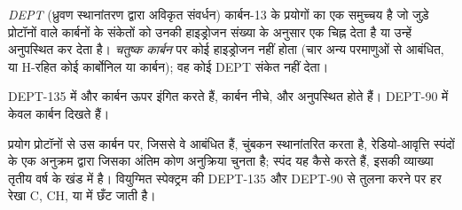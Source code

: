 \begin{definition}[DEPT]\label{def:b2:structure-determination:dept}
\emph{DEPT} (ध्रुवण स्थानांतरण द्वारा अविकृत संवर्धन) कार्बन-13 के प्रयोगों का एक समुच्चय है
जो जुड़े प्रोटॉनों वाले कार्बनों के संकेतों को उनकी हाइड्रोजन संख्या के अनुसार एक चिह्न देता है या उन्हें
अनुपस्थित कर देता है। \emph{चतुष्क कार्बन} पर कोई हाइड्रोजन नहीं होता
(चार अन्य परमाणुओं से आबंधित, या H-रहित कोई कार्बोनिल या  कार्बन); वह कोई DEPT संकेत नहीं देता।
\end{definition}

\begin{proposition}[DEPT पढ़ना]\label{prop:b2:structure-determination:dept}
DEPT-135 में  और  कार्बन ऊपर इंगित करते हैं,  कार्बन नीचे, और 
अनुपस्थित होते हैं। DEPT-90 में केवल  कार्बन दिखते हैं।
\end{proposition}

\admitted

प्रयोग प्रोटॉनों से उस कार्बन पर, जिससे वे आबंधित हैं, चुंबकन स्थानांतरित करता है,
रेडियो-आवृत्ति स्पंदों के एक अनुक्रम द्वारा जिसका अंतिम कोण अनुक्रिया चुनता है; स्पंद यह कैसे करते हैं, इसकी
व्याख्या तृतीय वर्ष के खंड में है। वियुग्मित स्पेक्ट्रम की DEPT-135 और DEPT-90 से तुलना करने पर हर
रेखा C, CH,  या  में छँट जाती है।

